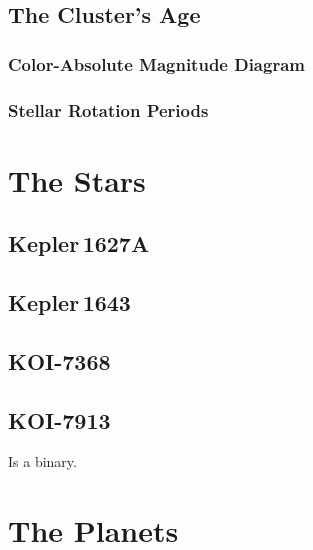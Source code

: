 \documentclass[12pt,modern,tighten]{aastex63}
\begin{document}
\subsection{The Cluster's Age}
\label{sec:clusterage}

\subsubsection{Color-Absolute Magnitude Diagram}
\label{sec:camd}

\subsubsection{Stellar Rotation Periods}

\section{The Stars}
\label{sec:stars}

\subsection{Kepler\,1627A}
\subsection{Kepler\,1643}
\subsection{KOI-7368}
\subsection{KOI-7913}
Is a binary.

\section{The Planets}
\label{sec:planet}
\end{document}
